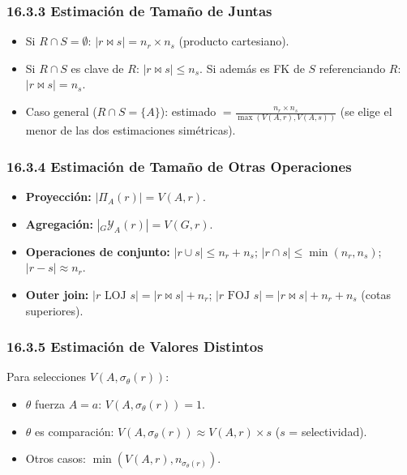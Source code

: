 \documentclass[11pt, a4paper]{article}
\begin{document}
\subsubsection{16.3.3 Estimación de Tamaño de Juntas}

\begin{itemize}[nosep]
	\item Si $R \cap S = \emptyset$: $|r \bowtie s| = n_r \times n_s$ (producto cartesiano).
	\item Si $R \cap S$ es clave de $R$: $|r \bowtie s| \leq n_s$. Si además es FK de $S$ referenciando $R$: $|r \bowtie s| = n_s$.
	\item Caso general ($R \cap S = \{A\}$): estimado $= \frac{n_r \times n_s}{\max(V(A,r), V(A,s))}$ (se elige el menor de las dos estimaciones simétricas).
\end{itemize}

\subsubsection{16.3.4 Estimación de Tamaño de Otras Operaciones}

\begin{itemize}[nosep]
	\item \textbf{Proyección:} $|\Pi_A(r)| = V(A, r)$.
	\item \textbf{Agregación:} $|{}_G\mathcal{Y}_A(r)| = V(G, r)$.
	\item \textbf{Operaciones de conjunto:} $|r \cup s| \leq n_r + n_s$; $|r \cap s| \leq \min(n_r, n_s)$; $|r - s| \approx n_r$.
	\item \textbf{Outer join:} $|r \text{ LOJ } s| = |r \bowtie s| + n_r$; $|r \text{ FOJ } s| = |r \bowtie s| + n_r + n_s$ (cotas superiores).
\end{itemize}

\subsubsection{16.3.5 Estimación de Valores Distintos}

Para selecciones $V(A, \sigma_\theta(r))$:
\begin{itemize}[nosep]
	\item $\theta$ fuerza $A = a$: $V(A, \sigma_\theta(r)) = 1$.
	\item $\theta$ es comparación: $V(A, \sigma_\theta(r)) \approx V(A, r) \times s$ ($s$ = selectividad).
	\item Otros casos: $\min(V(A, r), n_{\sigma_\theta(r)})$.
\end{itemize}
\end{document}

